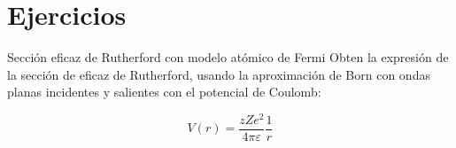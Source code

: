 \section*{Ejercicios}


\begin{Ejercicio}{Sección eficaz de Rutherford con modelo atómico de Fermi} \label{Ej:01.01}
    Obten la expresión de la sección de eficaz de Rutherford, usando la aproximación de Born con ondas planas incidentes y salientes con el potencial de Coulomb:

    \begin{equation}
        V(r) = \frac{zZe^2}{4\pi \varepsilon} \frac{1}{r}
    \end{equation}
\end{Ejercicio}


